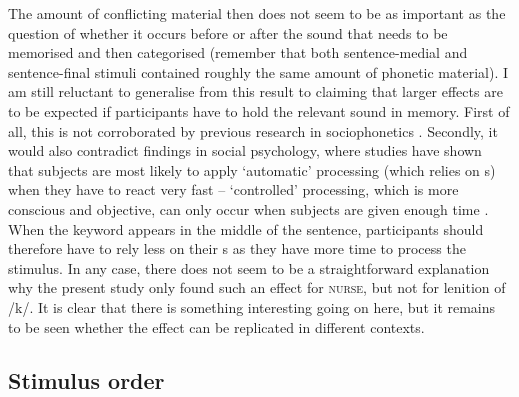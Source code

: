The amount of conflicting material then does not seem to be as important as the question of whether it occurs before or after the sound that needs to be memorised and then categorised (remember that both sentence-medial and sentence-final stimuli contained roughly the same amount of phonetic material).
I am still reluctant to generalise from this result to claiming that larger  effects are to be expected if participants have to hold the relevant sound in memory.
First of all, this is not corroborated by previous research in sociophonetics \parencite{hayetal2006a,haydrager2010}.
Secondly, it would also contradict findings in social psychology, where studies have shown that subjects are most likely to apply `automatic' processing (which relies on s) when they have to react very fast -- `controlled' processing, which is more conscious and objective, can only occur when subjects are given enough time \parencite[cf.][33--34]{petersensix2008}.
When the keyword appears in the middle of the sentence, participants should therefore have to rely less on their s as they have more time to process the stimulus.
In any case, there does not seem to be a straightforward explanation why the present study only found such an effect for \textsc{nurse}, but not for lenition of /k/.
It is clear that there is something interesting going on here, but it remains to be seen whether the effect can be replicated in different contexts.

		\subsection{Stimulus order}

